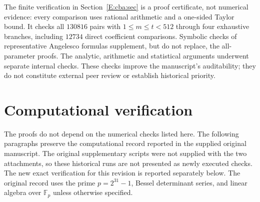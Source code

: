 \documentclass[11pt,a4paper]{article}
\theoremstyle{definition}
\theoremstyle{remark}
\numberwithin{equation}{section}
\begin{document}
The finite verification in Section~\ref{E:cba:sec} is a proof certificate,
not numerical evidence: every comparison uses rational arithmetic and a
one-sided Taylor bound. It checks all $130816$ pairs with $1\le m\le
t<512$ through four exhaustive branches, including $12734$ direct
coefficient comparisons. Symbolic checks of representative Angelesco
formulas supplement, but do not replace, the all-parameter proofs.
The analytic, arithmetic and statistical arguments underwent separate internal checks. These checks improve the manuscript's auditability; they do not
constitute external peer review or establish historical priority.


\clearpage
\appendix

\section{Computational verification}\label{B:app:comp}

The proofs do not depend on the numerical checks listed here. The following
paragraphs preserve the computational record reported in the supplied
original manuscript. The original supplementary scripts were not supplied
with the two attachments, so these historical runs are not presented as
newly executed checks. The new exact verification for this revision is
reported separately below. The original record uses the prime
$p=2^{31}-1$, Bessel determinant series, and linear algebra over
$\mathbb F_p$ unless otherwise specified.
\end{document}
